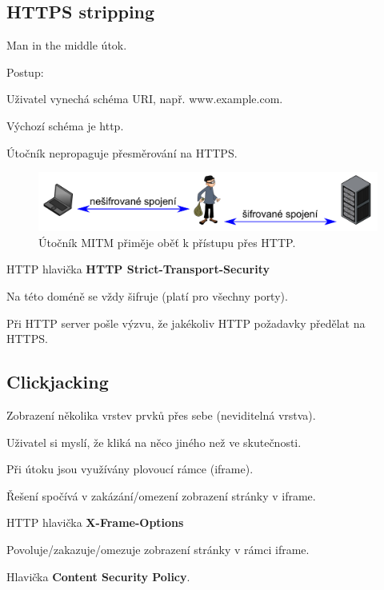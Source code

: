 \subsection{HTTPS stripping}

\begin{compactitem}
    \item Man in the middle útok.
    \item Postup: \begin{compactenum}
        \item Uživatel vynechá schéma URI, např. www.example.com.
        \item Výchozí schéma je http.
        \item Útočník nepropaguje přesměrování na HTTPS.
    \end{compactenum}

    \begin{figure}[H]
        \centering
        \includegraphics[width=0.9\linewidth]{https_stripping.pdf}
        \caption{Útočník MITM přiměje oběť k přístupu přes HTTP.}
    \end{figure}

    \item HTTP hlavička \textbf{HTTP Strict-Transport-Security} \begin{compactitem}
        \item Na této doméně se vždy šifruje (platí pro všechny porty).
        \item Při HTTP server pošle výzvu, že jakékoliv HTTP požadavky předělat na HTTPS.
    \end{compactitem}
\end{compactitem}

\subsection{Clickjacking}

\begin{compactitem}
    \item Zobrazení několika vrstev prvků přes sebe (neviditelná vrstva).
    \item Uživatel si myslí, že kliká na něco jiného než ve skutečnosti.
    \item Při útoku jsou využívány plovoucí rámce (iframe).
    \item Řešení spočívá v zakázání/omezení zobrazení stránky v iframe.

    \item HTTP hlavička \textbf{X-Frame-Options} \begin{compactitem}
        \item Povoluje/zakazuje/omezuje zobrazení stránky v rámci iframe.
    \end{compactitem}

    \item Hlavička \textbf{Content Security Policy}.
\end{compactitem}

